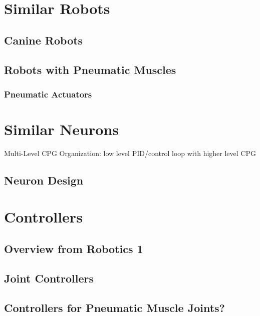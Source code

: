 \section{Similar Robots}

\subsection{Canine Robots}

\subsection{Robots with Pneumatic Muscles}

\subsubsection{Pneumatic Actuators}

\cite{einstein}

\section{Similar Neurons}

Multi-Level CPG Organization: low level PID/control loop with higher level CPG
\cite{MultiLevelCPG}

\subsection{Neuron Design}

\section{Controllers}

\subsection{Overview from Robotics 1}

\subsection{Joint Controllers}

\subsection{Controllers for Pneumatic Muscle Joints?}


